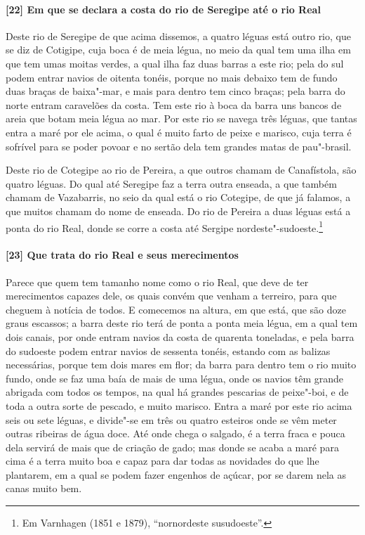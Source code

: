 \paragraph{[22] Em que se declara a costa do rio de Seregipe até o rio Real} \quad
Deste rio de Seregipe de que acima dissemos, a quatro léguas está outro rio, que se diz de
Cotigipe, cuja boca é de meia légua, no meio da qual tem uma ilha em que tem umas moitas
verdes, a qual ilha faz duas barras a este rio; pela do sul podem entrar navios de oitenta
tonéis, porque no mais debaixo tem de fundo duas braças de baixa"-mar, e mais para dentro
tem cinco braças; pela barra do norte entram caravelões da costa. Tem este rio à boca da
barra uns bancos de areia que botam meia légua ao mar. Por este rio se navega três léguas,
que tantas entra a maré por ele acima, o qual é muito farto de peixe e marisco, cuja terra
é sofrível para se poder povoar e no sertão dela tem grandes matas de pau"-brasil.

Deste rio de Cotegipe ao rio de Pereira, a que outros chamam de Canafístola, são quatro
léguas. Do qual até Seregipe faz a terra outra enseada, a que também chamam de Vazabarris,
no seio da qual está o rio Cotegipe, de que já falamos, a que muitos chamam do nome de
enseada. Do rio de Pereira a duas léguas está a ponta do rio Real, donde se corre a costa
até Sergipe nordeste"-sudoeste.\footnote{ Em Varnhagen (1851 e 1879), ``nornordeste
susudoeste''.}

\paragraph{[23] Que trata do rio Real e seus merecimentos} \quad
Parece que quem tem tamanho nome como o rio Real, que deve de ter merecimentos capazes
dele, os quais convém que venham a terreiro, para que cheguem à notícia de todos. E
comecemos na altura, em que está, que são doze graus escassos; a barra deste rio terá de
ponta a ponta meia légua, em a qual tem dois canais, por onde entram navios da costa de
quarenta toneladas, e pela barra do sudoeste podem entrar navios de sessenta tonéis,
estando com as balizas necessárias, porque tem dois mares em flor; da barra para dentro
tem o rio muito fundo, onde se faz uma baía de mais de uma légua, onde os navios têm
grande abrigada com todos os tempos, na qual há grandes pescarias de peixe"-boi, e de toda
a outra sorte de pescado, e muito marisco. Entra a maré por este rio acima seis ou sete
léguas, e divide"-se em três ou quatro esteiros onde se vêm meter outras ribeiras de água
doce. Até onde chega o salgado, é a terra fraca e pouca dela servirá de mais que de
criação de gado; mas donde se acaba a maré para cima é a terra muito boa e capaz para dar
todas as novidades do que lhe plantarem, em a qual se podem fazer engenhos de açúcar, por
se darem nela as canas muito bem.

